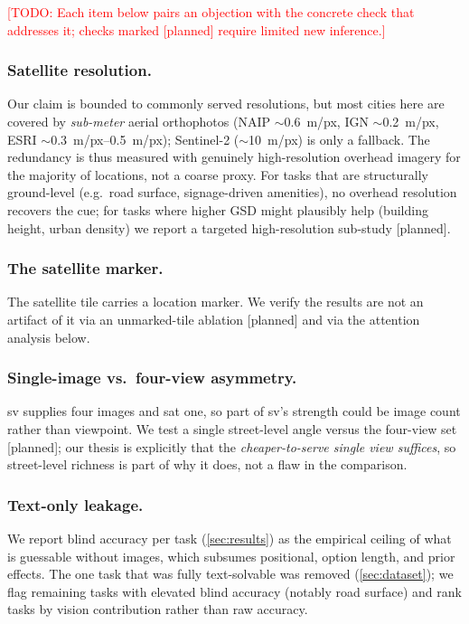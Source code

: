 \documentclass[runningheads]{llncs}
\newcommand{\todo}[1]{\textcolor{red}{[TODO: #1]}}
\begin{document}
\todo{Each item below pairs an objection with the concrete check that addresses
it; checks marked \textsf{[planned]} require limited new inference.}

\subsubsection{Satellite resolution.}
Our claim is bounded to commonly served resolutions, but most cities here are
covered by \emph{sub-meter} aerial orthophotos (NAIP $\sim$\SI{0.6}{m/px}, IGN
$\sim$\SI{0.2}{m/px}, ESRI $\sim$\SIrange{0.3}{0.5}{m/px}); Sentinel-2
($\sim$\SI{10}{m/px}) is only a fallback. The redundancy is thus measured with
genuinely high-resolution overhead imagery for the majority of locations, not a
coarse proxy. For tasks that are structurally ground-level (e.g.\ road surface,
signage-driven amenities), no overhead resolution recovers the cue; for tasks
where higher GSD might plausibly help (building height, urban density) we report
a targeted high-resolution sub-study \textsf{[planned]}.

\subsubsection{The satellite marker.}
The satellite tile carries a location marker. We verify the results are not an
artifact of it via an unmarked-tile ablation \textsf{[planned]} and via the
attention analysis below.

\subsubsection{Single-image vs.\ four-view asymmetry.}
\textsf{sv} supplies four images and \textsf{sat} one, so part of \textsf{sv}'s
strength could be image count rather than viewpoint. We test a single
street-level angle versus the four-view set \textsf{[planned]}; our thesis is
explicitly that the \emph{cheaper-to-serve single view suffices}, so street-level
richness is part of why it does, not a flaw in the comparison.

\subsubsection{Text-only leakage.}
We report \textsf{blind} accuracy per task (\cref{sec:results}) as the empirical
ceiling of what is guessable without images, which subsumes positional, option
length, and prior effects. The one task that was fully text-solvable was removed
(\cref{sec:dataset}); we flag remaining tasks with elevated \textsf{blind}
accuracy (notably road surface) and rank tasks by vision contribution rather than
raw accuracy.
\end{document}
